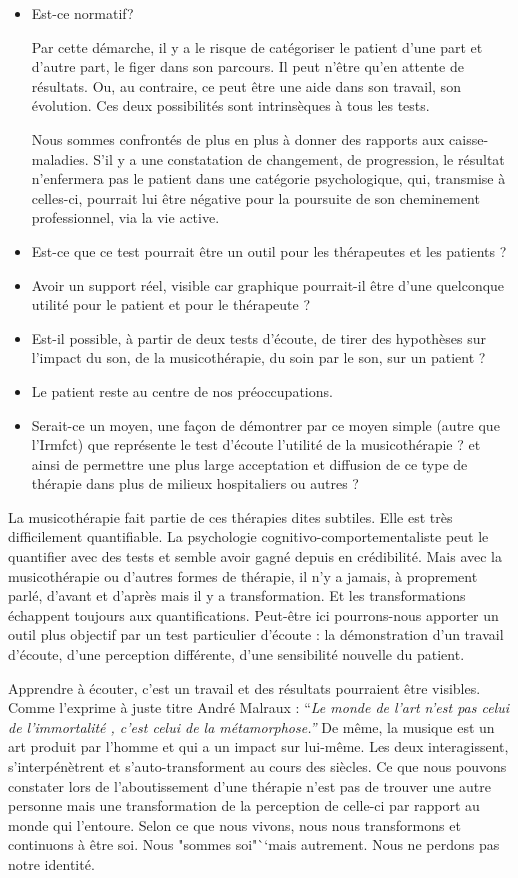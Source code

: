 \begin{itemize}
\item Est-ce normatif? 

Par cette démarche, il y a le risque de catégoriser le patient d'une part 
 et d'autre part, le figer dans son parcours. Il peut n'être qu'en attente de résultats. Ou, au contraire, ce peut être une aide 
dans son travail, son évolution. Ces deux possibilités sont
intrinsèques à tous les tests.

Nous sommes confrontés de plus en plus à donner des rapports aux caisse-maladies.
S'il y a une constatation de changement, de progression, le résultat
n'enfermera pas le patient dans une catégorie psychologique, qui,
transmise à celles-ci, pourrait lui être négative pour la poursuite
de son cheminement professionnel, via la vie active. 
\item Est-ce que ce test pourrait être un outil pour les thérapeutes et
les patients ? 
\item Avoir un support réel, visible car graphique pourrait-il être d'une
quelconque utilité pour le patient et pour le thérapeute ?
\item Est-il possible, à partir de deux tests d'écoute, de tirer des hypothèses
sur l'impact du son, de la musicothérapie, du soin par le son, sur
un patient ?
\item Le patient reste au centre de nos préoccupations.
\item Serait-ce un moyen, une façon de démontrer par ce moyen simple (autre
que l'Irmfct) que représente le test d'écoute l'utilité de la musicothérapie
? et ainsi de permettre une plus large acceptation et diffusion de
ce type de thérapie dans plus de milieux hospitaliers ou autres ?


\end{itemize}

La musicothérapie fait partie de ces thérapies dites subtiles. Elle
est très difficilement quantifiable. La
psychologie cognitivo-comportementaliste peut le quantifier avec des tests et semble avoir gagné depuis en crédibilité. Mais avec la musicothérapie ou d'autres formes de thérapie, il n'y a
jamais, à proprement parlé, d'avant et d'après mais il y a transformation.
Et les transformations échappent toujours aux quantifications. Peut-être
ici pourrons-nous apporter un outil plus objectif par un test particulier
d'écoute : la démonstration d'un travail d'écoute, d'une perception
différente, d'une sensibilité nouvelle du patient. 

Apprendre à écouter,
c'est un travail et des résultats pourraient être visibles.
Comme l'exprime à juste titre André Malraux : ``\emph{Le monde de
	l'art n'est pas celui de l'immortalité , c'est celui de la métamorphose.''}
De même, la musique est un art produit par l'homme et qui a un impact
sur lui-même. Les deux interagissent, s'interpénètrent et s'auto-transforment
au cours des siècles.
 Ce que nous pouvons constater lors de l'aboutissement
d'une thérapie n'est pas de trouver une autre personne mais une transformation
de la perception de celle-ci par rapport au monde qui l'entoure. Selon
ce que nous vivons, nous nous transformons et continuons à être
soi. Nous "sommes soi"``mais autrement. Nous ne perdons
pas notre identité.

